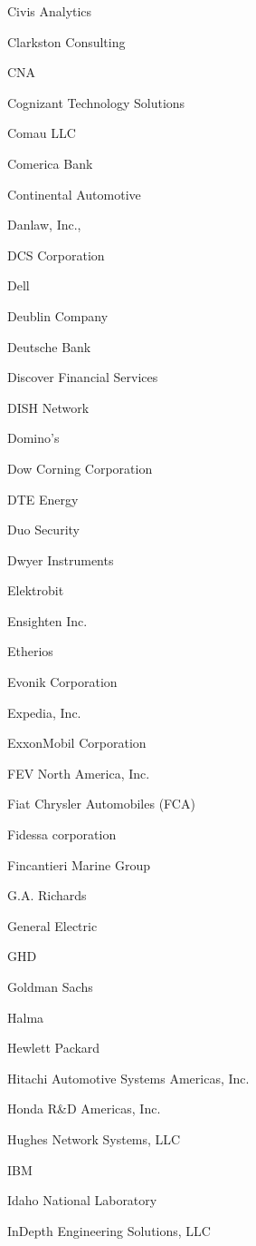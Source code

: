 \documentclass[twoside]{article}
\begin{document}
\begin{center}
\begin{multicols}{5}
\begin{FlushLeft}
\begin{compactitem}
\item Civis Analytics
\item Clarkston Consulting
\item CNA
\item Cognizant Technology Solutions
\item Comau LLC
\item Comerica Bank
\item Continental Automotive
\item Danlaw, Inc.,
\item DCS Corporation
\item Dell
\item Deublin Company
\item Deutsche Bank
\item Discover Financial Services
\item DISH Network
\item Domino's
\item Dow Corning Corporation
\item DTE Energy
\item Duo Security
\item Dwyer Instruments
\item Elektrobit
\item Ensighten Inc.
\item Etherios
\item Evonik Corporation
\item Expedia, Inc.
\item ExxonMobil Corporation
\item FEV North America, Inc.
\item Fiat Chrysler Automobiles (FCA)
\item Fidessa corporation
\item Fincantieri Marine Group
\item G.A. Richards
\item General Electric
\item GHD
\item Goldman Sachs
\item Halma
\item Hewlett Packard
\item Hitachi Automotive Systems Americas, Inc.
\item Honda R\&D Americas, Inc.
\item Hughes Network Systems, LLC
\item IBM
\item Idaho National Laboratory
\item InDepth Engineering Solutions, LLC

\end{compactitem}
\end{FlushLeft}
\end{multicols}
\end{center}
\end{document}
